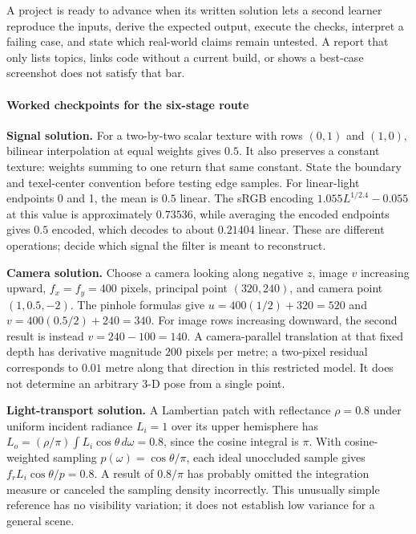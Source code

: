 A project is ready to advance when its written solution lets a second learner reproduce the inputs, derive the expected output, execute the checks, interpret a failing case, and state which real-world claims remain untested. A report that only lists topics, links code without a current build, or shows a best-case screenshot does not satisfy that bar.

\paragraph{Worked checkpoints for the six-stage route}\label{03-visual-computing-i-ch001-worked-checkpoints-for-the-six-stage-route}

\hypertarget{03-visual-computing-i-ch001-worked-checkpoints-for-the-six-stage-route}{}

\textbf{Signal solution.} For a two-by-two scalar texture with rows \((0,1)\) and \((1,0)\), bilinear interpolation at equal weights gives \(0.5\). It also preserves a constant texture: weights summing to one return that same constant. State the boundary and texel-center convention before testing edge samples. For linear-light endpoints 0 and 1, the mean is \(0.5\) linear. The sRGB encoding \(1.055L^{1/2.4}-0.055\) at this value is approximately \(0.73536\), while averaging the encoded endpoints gives \(0.5\) encoded, which decodes to about \(0.21404\) linear. These are different operations; decide which signal the filter is meant to reconstruct.

\textbf{Camera solution.} Choose a camera looking along negative \(z\), image \(v\) increasing upward, \(f_x=f_y=400\) pixels, principal point \((320,240)\), and camera point \((1,0.5,-2)\). The pinhole formulas give \(u=400(1/2)+320=520\) and \(v=400(0.5/2)+240=340\). For image rows increasing downward, the second result is instead \(v=240-100=140\). A camera-parallel translation at that fixed depth has derivative magnitude \(200\) pixels per metre; a two-pixel residual corresponds to \(0.01\) metre along that direction in this restricted model. It does not determine an arbitrary 3-D pose from a single point.

\textbf{Light-transport solution.} A Lambertian patch with reflectance \(\rho=0.8\) under uniform incident radiance \(L_i=1\) over its upper hemisphere has \(L_o=(\rho/\pi)\int L_i\cos\theta\,d\omega=0.8\), since the cosine integral is \(\pi\). With cosine-weighted sampling \(p(\omega)=\cos\theta/\pi\), each ideal unoccluded sample gives \(f_rL_i\cos\theta/p=0.8\). A result of \(0.8/\pi\) has probably omitted the integration measure or canceled the sampling density incorrectly. This unusually simple reference has no visibility variation; it does not establish low variance for a general scene.

